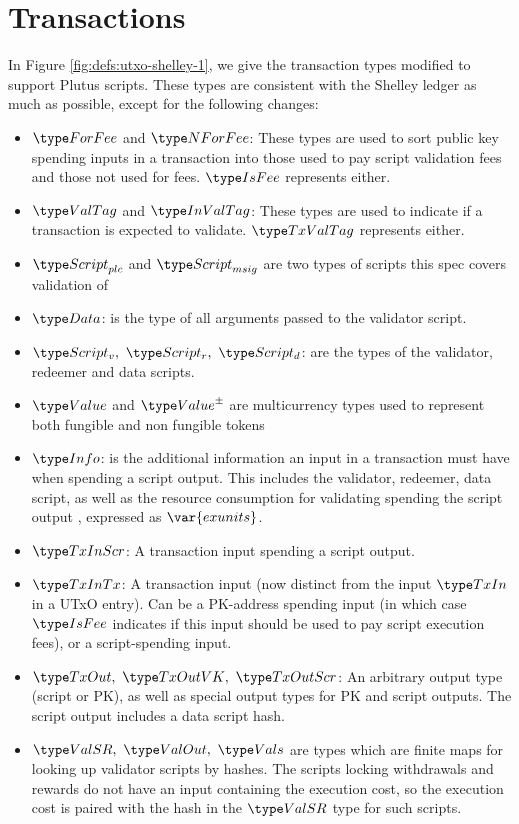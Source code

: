 \section{Transactions}
\label{sec:transactions}

In Figure \ref{fig:defs:utxo-shelley-1}, we give the transaction types modified
to support Plutus scripts. These types are consistent with the Shelley ledger
as much as possible,
except for the following changes:

\begin{itemize}
  \item $\ForFee$ and $\NForFee$: These types are used to sort public key
  spending inputs in a transaction into those used to pay script validation
  fees and those not used
  for fees. $\IsFee$ represents either.

  \item $\ValTag$ and $\InValTag$: These types are used to indicate if a
  transaction is expected to validate.
  $\TxValTag$ represents either.

  \item $\ScriptPlutus$ and $\ScriptMSig$ are two types of scripts this spec
  covers validation of

  \item $\Data$: is the type of all arguments passed to the validator script.

  \item $\ScriptV,~ \ScriptR,~ \ScriptD$: are the types of the validator,
  redeemer and data scripts.

  \item $\Value$ and $\ValuePM$ are multicurrency types used to represent
  both fungible and non fungible tokens

  \item $\Info$: is the additional information an input in a transaction must
  have when spending a script output. This includes the validator, redeemer,
  data script,
  as well as the resource consumption for validating spending the script output
  , expressed as $\var{exunits}$.

  \item $\TxInScr$: A transaction input spending a script output.

  \item $\TxInTx$: A transaction input (now distinct from the input $\TxIn$ in
  a UTxO entry). Can be a PK-address spending input
  (in which case $\IsFee$ indicates if this input should be used to pay script execution
  fees), or a script-spending input.

  \item $\TxOut,~\TxOutVK,~\TxOutScr$: An arbitrary output type (script or PK),
  as well as special output types for PK and script outputs. The script output
  includes a data script hash.

  \item $\ValSR,~\ValOut,~\Vals$ are types which are finite maps for looking up
  validator scripts by hashes. The scripts locking withdrawals and rewards
  do not have an input containing the execution cost, so the execution cost
  is paired with the hash in the $\ValSR$ type for such scripts.
\end{itemize}


